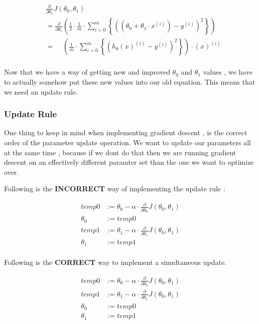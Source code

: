 \[
\begin{aligned}
	& \frac{\partial}{\partial \theta_1} J(\theta_{0}, \theta_{1}) \\
	& =
	\frac{\partial}{\partial \theta_1}
	\left(
		\frac{1}{2}
		\cdot \frac{1}{m}
		\cdot \sum_{i=0}^{m}
			\left\{
				\left(
					\left(
						\theta_{0} + \theta_{1} \cdot x^{(i)}
					\right)
					- y^{(i)}
				\right)^{2}
			\right\}
	\right)
	\\
	& =
	\phantom{ \frac{\partial}{\partial \theta_0} }
	\left(
	\frac{1}{m}
	\cdot \sum_{i=0}^{m}
		\left\{
			\left(
				h_{\theta}(x)^{(i)} - y^{(i)}
			\right)^{2}
		\right\}
	\right)
	\cdot (x)^{\left(i\right)}
	\\
\end{aligned}
\]

Now that we have a way of getting new and improved \( \theta_0 \) and \(
	\theta_1 \) values , we have to actually somehow put these new values into
our old equation. This means that we need an update rule.


\subsubsectionend
\subsubsection{Update Rule}
\label{sssec:update_rule}

One thing to keep in mind when implementing gradient descent , is the correct
order of the parameter update operation. We want to update our parameters
all at the same time , because if we dont do that then we are running gradient
descent on an effectively different paramter set than the one we want to
optimize over.

Following is the \textbf{INCORRECT} way of implementing the update rule :

\[
\begin{aligned}
	temp0 &:= \theta_0 - \alpha
	\cdot \frac{\partial}{\partial \theta_0} J(\theta_0,\theta_1) \\
	\theta_0 &:= temp0 \\
	temp1 &:= \theta_1 - \alpha
	\cdot \frac{\partial}{\partial \theta_1} J(\theta_0,\theta_1) \\
	\theta_1 &:= temp1 \\
\end{aligned}
\]

Following is the \textbf{CORRECT} way to implement a simultaneous update.

\[
\begin{aligned}
	temp0 &:= \theta_0 - \alpha
	\cdot \frac{\partial}{\partial \theta_0} J(\theta_0,\theta_1) \\
	temp1 &:= \theta_1 - \alpha
	\cdot \frac{\partial}{\partial \theta_1} J(\theta_0,\theta_1) \\
	\theta_0 &:= temp0 \\
	\theta_1 &:= temp1 \\
\end{aligned}
\]

